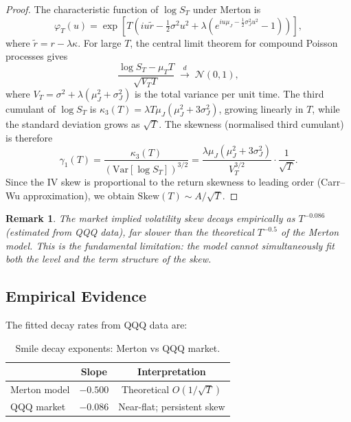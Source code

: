 \documentclass[12pt, a4paper]{article}
\newtheorem{remark}{Remark}
\begin{document}
\begin{proof}
The characteristic function of $\log S_T$ under Merton is
\[
    \varphi_T(u) = \exp\!\left[
    T\!\left(iu\tilde{r} - \tfrac{1}{2}\sigma^2 u^2
    + \lambda\left(e^{iu\mu_J - \frac{1}{2}\sigma_J^2 u^2}-1\right)\right)
    \right],
\]
where $\tilde{r} = r - \lambda\kappa$.
For large $T$, the central limit theorem for compound Poisson processes gives
\[
    \frac{\log S_T - \mu_T T}{\sqrt{V_T T}} \;\xrightarrow{d}\; \mathcal{N}(0,1),
\]
where $V_T = \sigma^2 + \lambda(\mu_J^2 + \sigma_J^2)$ is the total variance
per unit time. The third cumulant of $\log S_T$ is
$\kappa_3(T) = \lambda T \mu_J(\mu_J^2 + 3\sigma_J^2)$,
growing linearly in $T$, while the standard deviation grows as $\sqrt{T}$.
The skewness (normalised third cumulant) is therefore
\[
    \gamma_1(T) = \frac{\kappa_3(T)}{(\mathrm{Var}[\log S_T])^{3/2}}
    = \frac{\lambda\mu_J(\mu_J^2+3\sigma_J^2)}{V_T^{3/2}}\cdot\frac{1}{\sqrt{T}}.
\]
Since the IV skew is proportional to the return skewness to leading order
(Carr--Wu approximation), we obtain $\mathrm{Skew}(T) \sim A/\sqrt{T}$.
\end{proof}

\begin{remark}
The market implied volatility skew decays empirically as $T^{-0.086}$
(estimated from QQQ data), far slower than the theoretical $T^{-0.5}$ of
the Merton model. This is the \emph{fundamental limitation}: the model cannot
simultaneously fit both the level and the term structure of the skew.
\end{remark}

\subsection{Empirical Evidence}

The fitted decay rates from QQQ data are:

\begin{table}[H]
\centering
\begin{tabular}{lcc}
\toprule
& \textbf{Slope} & \textbf{Interpretation} \\
\midrule
Merton model  & $-0.500$ & Theoretical $O(1/\sqrt{T})$ \\
QQQ market    & $-0.086$ & Near-flat; persistent skew \\
\bottomrule
\end{tabular}
\caption{Smile decay exponents: Merton vs QQQ market.}
\end{table}
\end{document}
